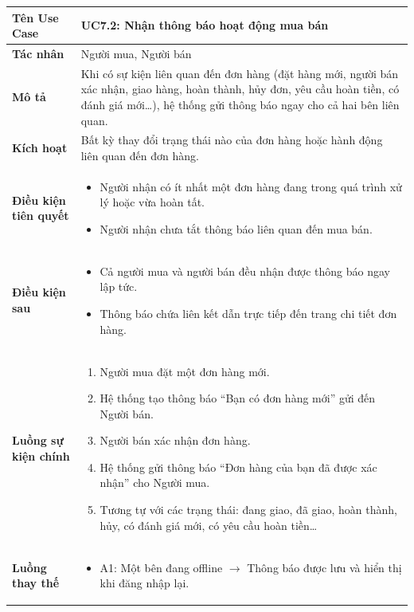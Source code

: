 \begin{table}[H]
\centering
\begin{tabularx}{\textwidth}{|l|X|}
\hline
\textbf{Tên Use Case} & \textbf{UC7.2: Nhận thông báo hoạt động mua bán} \\ \hline
\textbf{Tác nhân} & Người mua, Người bán \\ \hline
\textbf{Mô tả} & Khi có sự kiện liên quan đến đơn hàng (đặt hàng mới, người bán xác nhận, giao hàng, hoàn thành, hủy đơn, yêu cầu hoàn tiền, có đánh giá mới…), hệ thống gửi thông báo ngay cho cả hai bên liên quan. \\ \hline
\textbf{Kích hoạt} & Bất kỳ thay đổi trạng thái nào của đơn hàng hoặc hành động liên quan đến đơn hàng. \\ \hline
\textbf{Điều kiện tiên quyết} & 
\begin{itemize}
    \item Người nhận có ít nhất một đơn hàng đang trong quá trình xử lý hoặc vừa hoàn tất.
    \item Người nhận chưa tắt thông báo liên quan đến mua bán.
\end{itemize} \\ \hline
\textbf{Điều kiện sau} & 
\begin{itemize}
    \item Cả người mua và người bán đều nhận được thông báo ngay lập tức.
    \item Thông báo chứa liên kết dẫn trực tiếp đến trang chi tiết đơn hàng.
\end{itemize} \\ \hline
\textbf{Luồng sự kiện chính} & 
\begin{enumerate}
    \item Người mua đặt một đơn hàng mới.
    \item Hệ thống tạo thông báo ``Bạn có đơn hàng mới'' gửi đến Người bán.
    \item Người bán xác nhận đơn hàng.
    \item Hệ thống gửi thông báo ``Đơn hàng của bạn đã được xác nhận'' cho Người mua.
    \item Tương tự với các trạng thái: đang giao, đã giao, hoàn thành, hủy, có đánh giá mới, có yêu cầu hoàn tiền…
\end{enumerate} \\ \hline
\textbf{Luồng thay thế} & 
\begin{itemize}
    \item A1: Một bên đang offline $\rightarrow$ Thông báo được lưu và hiển thị khi đăng nhập lại.

\end{itemize}
\end{tabularx}
\end{table}
